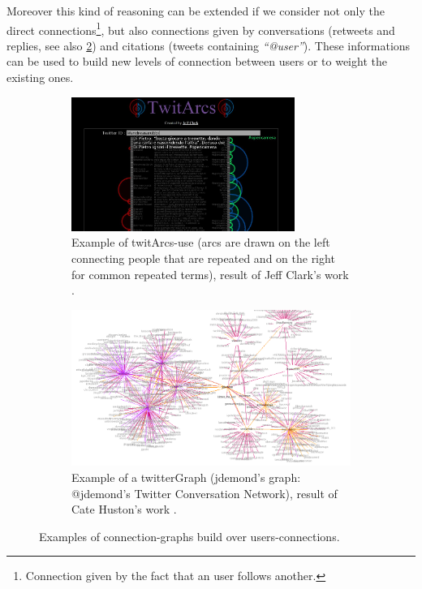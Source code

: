 \documentclass[a4paper,11pt,oneside]{article}
\begin{document}
Moreover this kind of reasoning can be extended if we consider not only the direct connections\footnote{Connection given by the fact that an user follows another.}, but also connections given by conversations (retweets and replies, see also \ref{fig:twitterGraph}) and citations (tweets containing \emph{``@user''}).
These informations can be used to build new levels of connection between users or to weight the existing ones.

\begin{figure}[htbp]
  \begin{subfigure}[h]{\textwidth}
    \centering
    \includegraphics[width=0.8\textwidth]{./image/twitArcs.jpg}
    \caption{Example of twitArcs-use (arcs are drawn on the left connecting people that are repeated and on the right for common repeated terms), result of Jeff Clark's work \cite{clark3}.}
    \label{fig:twitArcs}
  \end{subfigure}
  \hspace{8mm}
  \begin{subfigure}[h]{\textwidth}
    \centering
    \includegraphics[width=01\textwidth]{./image/jdemondGraph.png}
    \caption{Example of a twitterGraph (jdemond's graph: @jdemond's Twitter Conversation Network), result of Cate Huston's work \cite{huston}.}
    \label{fig:twitterGraph}
   \end{subfigure}
   \caption{Examples of connection-graphs build over users-connections.}
  \label{fig:graph}
\end{figure}
\end{document}
